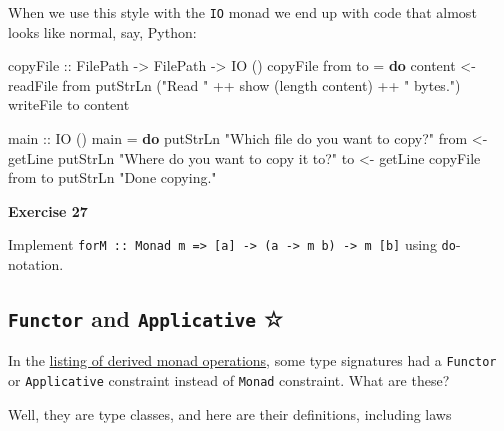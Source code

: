 \documentclass[11pt,
  american,
  DIV13]{article}
\newenvironment{Shaded}{}{}
\newcommand{\DataTypeTok}[1]{\textcolor[rgb]{0.56,0.13,0.00}{#1}}
\newcommand{\FunctionTok}[1]{\textcolor[rgb]{0.02,0.16,0.49}{#1}}
\newcommand{\KeywordTok}[1]{\textcolor[rgb]{0.00,0.44,0.13}{\textbf{#1}}}
\newcommand{\NormalTok}[1]{#1}
\newcommand{\OperatorTok}[1]{\textcolor[rgb]{0.40,0.40,0.40}{#1}}
\newcommand{\OtherTok}[1]{\textcolor[rgb]{0.00,0.44,0.13}{#1}}
\newcommand{\StringTok}[1]{\textcolor[rgb]{0.25,0.44,0.63}{#1}}
\begin{document}
When we use this style with the \texttt{IO} monad we end up with code
that almost looks like normal, say, Python:

\begin{Shaded}
\begin{Highlighting}[]
\OtherTok{copyFile ::} \DataTypeTok{FilePath} \OtherTok{{-}\textgreater{}} \DataTypeTok{FilePath} \OtherTok{{-}\textgreater{}} \DataTypeTok{IO}\NormalTok{ ()}
\NormalTok{copyFile from to }\OtherTok{=} \KeywordTok{do}
\NormalTok{    content }\OtherTok{\textless{}{-}} \FunctionTok{readFile}\NormalTok{ from}
    \FunctionTok{putStrLn}\NormalTok{ (}\StringTok{"Read "} \OperatorTok{++} \FunctionTok{show}\NormalTok{ (}\FunctionTok{length}\NormalTok{ content) }\OperatorTok{++} \StringTok{" bytes."}\NormalTok{)}
    \FunctionTok{writeFile}\NormalTok{ to content}

\OtherTok{main ::} \DataTypeTok{IO}\NormalTok{ ()}
\NormalTok{main }\OtherTok{=} \KeywordTok{do}
    \FunctionTok{putStrLn} \StringTok{"Which file do you want to copy?"}
\NormalTok{    from }\OtherTok{\textless{}{-}} \FunctionTok{getLine}
    \FunctionTok{putStrLn} \StringTok{"Where do you want to copy it to?"}
\NormalTok{    to }\OtherTok{\textless{}{-}} \FunctionTok{getLine}
\NormalTok{    copyFile from to}
    \FunctionTok{putStrLn} \StringTok{"Done copying."}
\end{Highlighting}
\end{Shaded}

\textbf{Exercise 27}

Implement
\texttt{forM\ ::\ Monad\ m\ =\textgreater{}\ {[}a{]}\ -\textgreater{}\ (a\ -\textgreater{}\ m\ b)\ -\textgreater{}\ m\ {[}b{]}}
using \texttt{do}-notation.

\hypertarget{functor-and-applicative}{%
\subsection{\texorpdfstring{\texttt{Functor} and \texttt{Applicative}
☆}{Functor and Applicative ☆}}\label{functor-and-applicative}}

In the \protect\hyperlink{monad-ops}{listing of derived monad
operations}, some type signatures had a \texttt{Functor} or
\texttt{Applicative} constraint instead of \texttt{Monad} constraint.
What are these?

Well, they are type classes, and here are their definitions, including
laws
\end{document}
